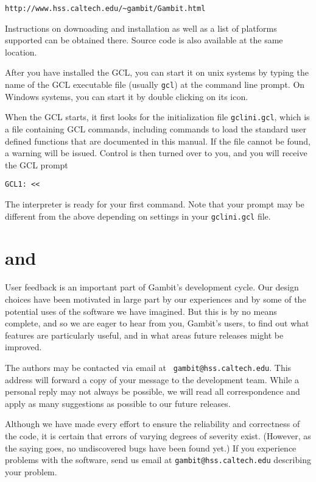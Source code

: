 \begin{verbatim}
http://www.hss.caltech.edu/~gambit/Gambit.html
\end{verbatim} 

\noindent Instructions on downoading and installation as well as a
list of platforms supported can be obtained there.  Source code is
also available at the same location. 

After you have installed the GCL, you can start it on unix systems by
typing the name of the GCL executable file (usually \verb+gcl+) at the
command line prompt.  On Windows systems, you can start it by double
clicking on its icon.

When the GCL starts, it first looks for the initialization file
\verb+gclini.gcl+, which is a file containing GCL commands, including
commands to load the standard user defined functions that are
documented in this manual.  If the file cannot be found, a warning
will be issued.  Control is then turned over to you, and you will
receive the GCL prompt

\begin{verbatim}
GCL1: << 
\end{verbatim}

\noindent The interpreter is ready for your first command.  Note that
your prompt may be different from the above depending on settings in
your \verb+gclini.gcl+ file.  


\section{ and }

User feedback is an important part of Gambit's development cycle.  Our
design choices have been motivated in large part by our experiences
and by some of the potential uses of the software we have imagined.
But this is by no means complete, and so we are eager to hear from
you, Gambit's users, to find out what features are particularly
useful, and in what areas future releases might be improved.

The authors may be contacted via email at {\tt
gambit@hss.caltech.edu}.  This address will forward a copy of your
message to the development team.  While a personal reply may not
always be possible, we will read all correspondence and apply as many
suggestions as possible to our future releases.

Although we have made every effort to ensure the reliability and
correctness of the code, it is certain that errors of varying degrees
of severity exist.  (However, as the saying goes, no undiscovered bugs
have been found yet.)  If you experience problems with the software,
send us email at {\tt gambit@hss.caltech.edu} describing your problem.

